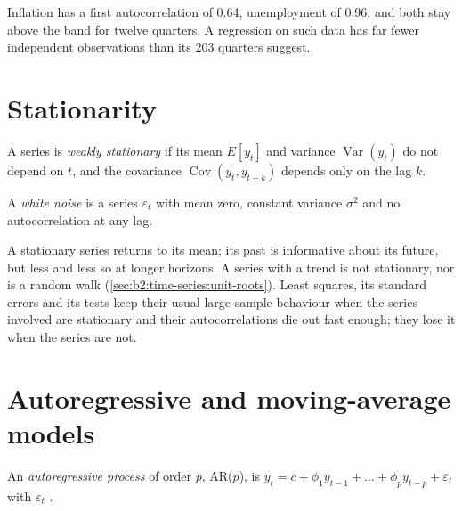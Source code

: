 \label{lst:b2:time-series:acf}

\label{out:b2:time-series:acf}

Inflation has a first autocorrelation of 0.64, unemployment of 0.96, and both stay above the band for twelve quarters. A
regression on such data has far fewer independent observations than its 203 quarters suggest.

\section{Stationarity}\label{sec:b2:time-series:stationarity}

\begin{definition}\label{def:b2:time-series:stationarity}
A series is \emph{weakly stationary} if its mean $E[y_t]$ and variance $\operatorname{Var}(y_t)$
do not depend on $t$, and the covariance $\operatorname{Cov}(y_t, y_{t-k})$ depends only on the lag $k$.
\end{definition}

\begin{definition}\label{def:b2:time-series:white-noise}
A \emph{white noise} is a series $\varepsilon_t$ with mean zero, constant variance $\sigma^2$ and no
autocorrelation at any lag.
\end{definition}

A stationary series returns to its mean; its past is informative about its future, but less and less so at longer
horizons. A series with a trend is not stationary, nor is a random walk (\cref{sec:b2:time-series:unit-roots}). Least
squares, its standard errors and its tests keep their usual large-sample behaviour when the series involved are
stationary and their autocorrelations die out fast enough; they lose it when the series are not.

\section{Autoregressive and moving-average models}\label{sec:b2:time-series:arma}

\begin{definition}\label{def:b2:time-series:ar}
An \emph{autoregressive process} of order $p$, AR($p$), is $y_t = c + \phi_1y_{t-1} + \dots
+ \phi_py_{t-p} + \varepsilon_t$ with $\varepsilon_t$ .
\end{definition}

